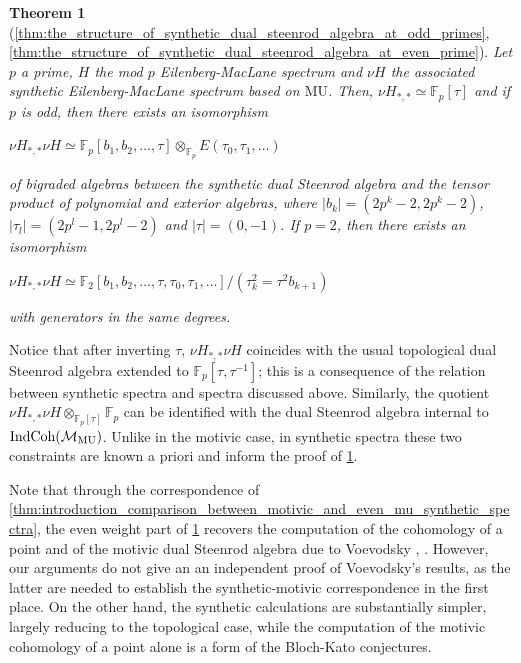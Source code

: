 \documentclass[oneside,a4paper]{amsart}
\newcommand{\IndCoh}{\textnormal{IndCoh}} %
\newcommand{\MU}{\mathrm{MU}} %
\newcommand{\fieldp}{\mathbb{F}_{p}} %
\newcommand{\fieldtwo}{\mathbb{F}_{2}} %
\theoremstyle{plain}
\newtheorem{thm}{Theorem}[section]
\theoremstyle{definition}
\theoremstyle{remark}
\begin{document}
\begin{thm}[\ref{thm:the_structure_of_synthetic_dual_steenrod_algebra_at_odd_primes}, \ref{thm:the_structure_of_synthetic_dual_steenrod_algebra_at_even_prime}]
\label{thm:introduction_structure_of_dual_synthetic_steenrod_algebra}
Let $p$ a prime, $H$ the mod $p$ Eilenberg-MacLane spectrum and $\nu H$ the associated synthetic Eilenberg-MacLane spectrum based on $\MU$. Then, $\nu H_{*, *} \simeq \fieldp[\tau]$ and if $p$ is odd, then there exists an isomorphism 

\begin{center}
$\nu H_{*, *} \nu H \simeq \fieldp[b_{1}, b_{2}, \ldots, \tau] \otimes _{\fieldp} E(\tau_{0}, \tau_{1}, \ldots)$
\end{center}
of bigraded algebras between the synthetic dual Steenrod algebra and the tensor product of polynomial and exterior algebras, where $| b_{k} | = (2p^{k}-2, 2p^{k}-2)$, $| \tau_{l} | = (2p^{l}-1, 2p^{l}-2)$ and $| \tau | = (0, -1)$.
If $p = 2$, then there exists an isomorphism
\begin{center}
$\nu H_{*, *} \nu H \simeq \fieldtwo[b_{1}, b_{2}, \ldots, \tau, \tau_{0}, \tau_{1}, \ldots] / (\tau_{k}^{2} = \tau^{2} b_{k+1})$
\end{center}
with generators in the same degrees.
\end{thm}
Notice that after inverting $\tau$, $\nu H_{*, *} \nu H$ coincides with the usual topological dual Steenrod algebra extended to $\fieldp[\tau, \tau^{-1}]$; this is a consequence of the relation between synthetic spectra and spectra discussed above. Similarly, the quotient $\nu H_{*, *} \nu H \otimes _{\fieldp[\tau]} \fieldp$ can be identified with the dual Steenrod algebra internal to $\IndCoh(\mathcal{M}_{\MU})$. Unlike in the motivic case, in synthetic spectra these two constraints are known a priori and inform the proof of \cref{thm:introduction_structure_of_dual_synthetic_steenrod_algebra}. 

Note that through the correspondence of \cref{thm:introduction_comparison_between_motivic_and_even_mu_synthetic_spectra}, the even weight part of \cref{thm:introduction_structure_of_dual_synthetic_steenrod_algebra} recovers the computation of the cohomology of a point and of the motivic dual Steenrod algebra due to Voevodsky \cite{voevodsky2003motivic}, \cite{voevodsky2010motivic}. However, our arguments do not give an an independent proof of Voevodsky's results, as the latter are needed to establish the synthetic-motivic correspondence in the first place.  On the other hand, the synthetic calculations are substantially simpler, largely reducing to the topological case, while the computation of the motivic cohomology of a point alone is a form of the Bloch-Kato conjectures. 
\end{document}
